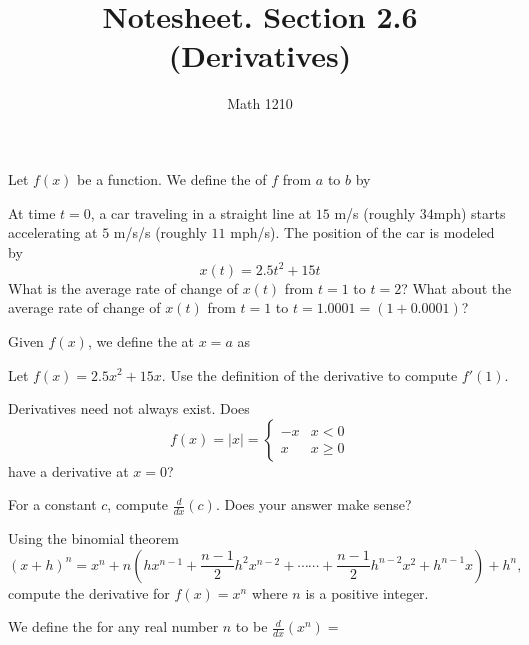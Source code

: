 \documentclass[12pt, a4paper]{article}
\author{Math 1210}
\title{Notesheet. Section 2.6 (Derivatives)}
\date{}
\begin{document}
\maketitle
\nameline
\begin{defi}
  Let \(f(x)\) be a function. We define the  of
  \(f\) from \(a\) to \(b\) by
\end{defi}
\begin{ex}
  At time \(t = 0\), a car traveling in a straight line  at \(15\) m/s
  (roughly \(34\)mph)
  starts accelerating at \(5\) m/s/s (roughly \(11\) mph/s). The
  position of the car is modeled by \[
    x(t) = 2.5 t^2 + 15 t
  \]
  What is the average rate of change of \(x(t)\) from \(t=1\) to
  \(t=2\)? What about the average rate of change of \(x(t)\) from
  \(t=1\) to \(t= 1.0001 = (1 + 0.0001)\)?
\end{ex}
\begin{defi}
  Given \(f(x)\), we define the  at \(x = a\) as
\end{defi}
\begin{ex}
  Let \(f(x) = 2.5x^2 + 15x\). Use the definition of the derivative to
  compute \(f'(1)\).
\end{ex}
\begin{ex}
  Derivatives need not always exist. Does \[
    f(x) = |x| =
    \begin{cases}
      -x & x < 0 \\
      x & x \geq 0
    \end{cases}
  \]
  have a derivative at \(x=0\)?
\end{ex}
\begin{ex}
  For a constant \(c\), compute \(\frac{d}{dx}(c)\). Does your answer
  make sense?
\end{ex}
\begin{ex}
  Using the binomial theorem \[
(x+h)^n = x^n +  n \left(h x^{n-1} +
    \frac{n-1}{2} h^2 x^{n-2} + \cdots
    \cdots + \frac{n-1}{2} h^{n-2} x^2 + h^{n-1} x\right) + h^n,
  \] compute the derivative for
  \(f(x) = x^n\) where \(n\) is a positive integer.
\end{ex}
\begin{defi}
  We define the  for any real number \(n\) to be \(\frac{d}{dx}(x^n) = \)
\end{defi}
\end{document}
